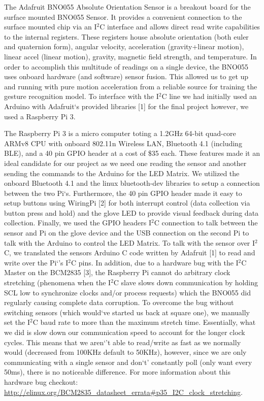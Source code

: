 \documentclass{sig-alternate-05-2015}
\begin{document}
The Adafruit BNO055 Absolute Orientation Sensor is a breakout board for the surface mounted BNO055 Sensor. It provides a convenient connection to the surface mounted chip via an I$^2$C interface and allows direct read write capabilities to the internal registers. These registers house absolute orientation (both euler and quaternion form), angular velocity, acceleration (gravity+linear motion), linear accel (linear motion), gravity, magnetic field strength, and temperature. In order to accomplish this multitude of readings on a single device, the BNO055 uses onboard hardware (and software) sensor fusion. This allowed us to get up and running with pure motion acceleration from a reliable source for training the gesture recognition model. To interface with the I$^2$C line we had initially used an Arduino with Adafruit`s provided libraries [1] for the final project however, we used a Raspberry Pi 3.

The Raspberry Pi 3 is a micro computer toting a 1.2GHz 64-bit quad-core ARMv8 CPU with onboard 802.11n Wireless LAN, Bluetooth 4.1 (including BLE), and a 40 pin GPIO header at a cost of \$35 each. These features made it an ideal candidate for our project as we need one reading the sensor and another sending the commands to the Arduino for the LED Matrix. We utilized the onboard Bluetooth 4.1 and the linux bluetooth-dev libraries to setup a connection between the two Pi`s. Furthermore, the 40 pin GPIO header made it easy to setup buttons using WiringPi [2] for both interrupt control (data collection via button press and hold) and the glove LED to provide visual feedback during data collection. Finally, we used the GPIO headers I$^2$C connection to talk between the sensor and Pi on the glove device and the USB connection on the second Pi to talk with the Arduino to control the LED Matrix. To talk with the sensor over I$^2$C, we translated the sensors Arduino C code written by Adafruit [1] to read and write over the Pi`'s I$^2$C pins. In addition, due to a hardware bug with the I$^2$C Master on the BCM2835 [3], the Raspberry Pi cannot do arbitrary clock stretching (phenomena when the I$^2$C slave slows down communication by holding SCL low to synchronize clocks and/or process requests) which the BNO055 did regularly causing complete data corruption. To overcome the bug without switching sensors (which would`ve started us back at square one), we manually set the I$^2$C baud rate to more than the maximum stretch time. Essentially, what we did is slow down our communication speed to account for the longer clock cycles. This means that we aren`'t able to read/write as fast as we normally would (decreased from 100KHz default to 50KHz), however, since we are only communicating with a single sensor and don`t' constantly poll (only want every 50ms), there is no noticeable difference. For more information about this hardware bug checkout: \url{http://elinux.org/BCM2835_datasheet_errata#p35_I2C_clock_stretching}.
\end{document}
